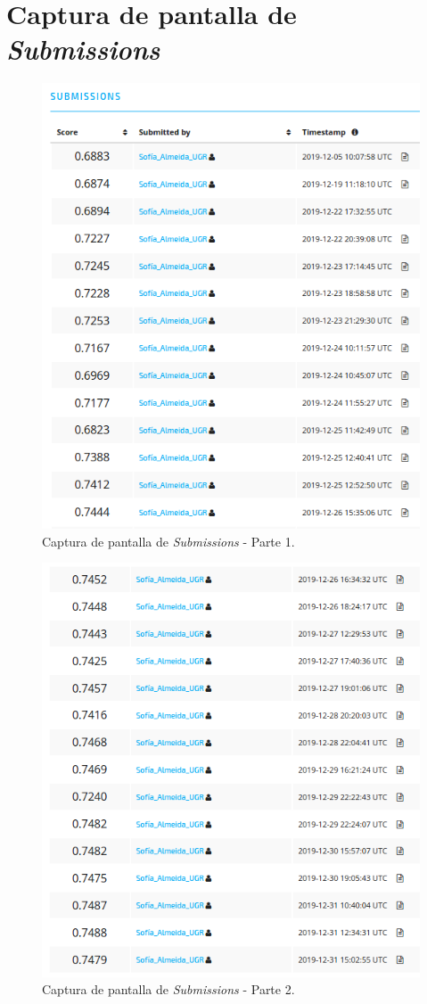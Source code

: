 \documentclass[a4paper, 20pt]{article}
\begin{document}
\section{Captura de pantalla de \textit{Submissions}}
\label{sec:subsimissions}
\begin{figure}[H]
    \centering
    \includegraphics[height=1\textwidth, width=1\textwidth]{web1}
    \caption{Captura de pantalla de \textit{Submissions} - Parte 1.}
\end{figure}

\begin{figure}[H]
    \centering
    \includegraphics[height=1\textwidth, width=1\textwidth]{web2}
    \caption{Captura de pantalla de \textit{Submissions} - Parte 2.}
\end{figure}
\end{document}
